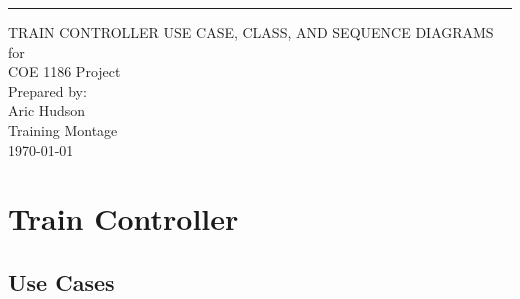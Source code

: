 \documentclass{scrreprt}
\begin{document}
\begin{flushright}
    \rule{16cm}{5pt}\vskip1cm
    \begin{bfseries}
        \Huge{TRAIN CONTROLLER USE CASE, CLASS, AND SEQUENCE DIAGRAMS}\\
        \vspace{.9cm}
        for\\
        \vspace{.9cm}
        COE 1186 Project\\
        \vspace{.9cm}
        \vspace{.9cm}
        Prepared by:\\
        Aric Hudson\\
        \vspace{4.9cm}
        Training Montage\\
        \vspace{.9cm}
        \today\\
    \end{bfseries}
\end{flushright}

\tableofcontents

\chapter{Train Controller}

\section{Use Cases}
\end{document}
